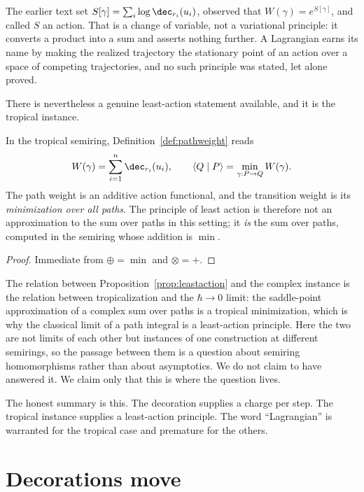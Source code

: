 The earlier text set $S[\gamma] = \sum_i \log \dec_{r_i}(u_i)$, observed
that $W(\gamma) = e^{S[\gamma]}$, and called $S$ an action.  That is a
change of variable, not a variational principle: it converts a product
into a sum and asserts nothing further.  A Lagrangian earns its name by
making the realized trajectory the stationary point of an action over a
space of competing trajectories, and no such principle was stated, let
alone proved.

There is nevertheless a genuine least-action statement available, and it
is the tropical instance.

\begin{proposition}
\label{prop:leastaction}
In the tropical semiring, Definition~\ref{def:pathweight} reads
\[
  W(\gamma) = \sum_{i=1}^{n} \dec_{r_i}(u_i),
  \qquad
  \langle Q \mid P \rangle = \min_{\gamma : P \to Q} W(\gamma).
\]
The path weight is an additive action functional, and the transition
weight is its \emph{minimization over all paths}.  The principle of least
action is therefore not an approximation to the sum over paths in this
setting; it \emph{is} the sum over paths, computed in the semiring whose
addition is $\min$.
\end{proposition}

\begin{proof}
Immediate from $\oplus = \min$ and $\otimes = +$.
\end{proof}

\begin{remark}
The relation between Proposition~\ref{prop:leastaction} and the complex
instance is the relation between tropicalization and the $\hbar \to 0$
limit: the saddle-point approximation of a complex sum over paths is a
tropical minimization, which is why the classical limit of a path
integral is a least-action principle.  Here the two are not limits of
each other but instances of one construction at different semirings, so
the passage between them is a question about semiring homomorphisms
rather than about asymptotics.  We do not claim to have answered it.  We
claim only that this is where the question lives.
\end{remark}

The honest summary is this.  The decoration supplies a charge per step.
The tropical instance supplies a least-action principle.  The word
``Lagrangian'' is warranted for the tropical case and premature for the
others.

\section{Decorations move}

